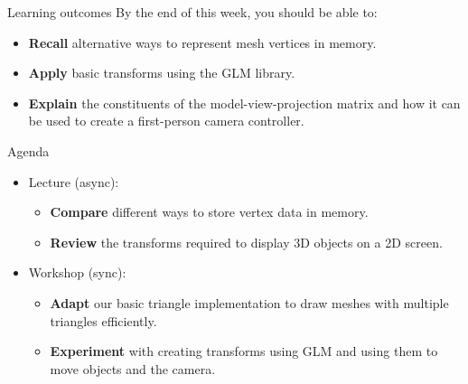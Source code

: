 \begin{frame}{Learning outcomes}
	By the end of this week, you should be able to:
	\begin{itemize}
		\item \textbf{Recall} alternative ways to represent mesh vertices in memory.
		\item \textbf{Apply} basic transforms using the GLM library.
		\item \textbf{Explain} the constituents of the model-view-projection matrix and how it can be used to create a first-person camera controller.
	\end{itemize}
\end{frame}

\begin{frame}{Agenda}
	\begin{itemize}
		\pause\item Lecture (async):
		\begin{itemize}
			\item \textbf{Compare} different ways to store vertex data in memory.
			\item \textbf{Review} the transforms required to display 3D objects on a 2D screen.
		\end{itemize}
		\pause\item Workshop (sync):
		\begin{itemize}
			\item \textbf{Adapt} our basic triangle implementation to draw meshes with multiple triangles efficiently.
			\item \textbf{Experiment} with creating transforms using GLM and using them to move objects and the camera.
		\end{itemize}
	\end{itemize}
\end{frame}
